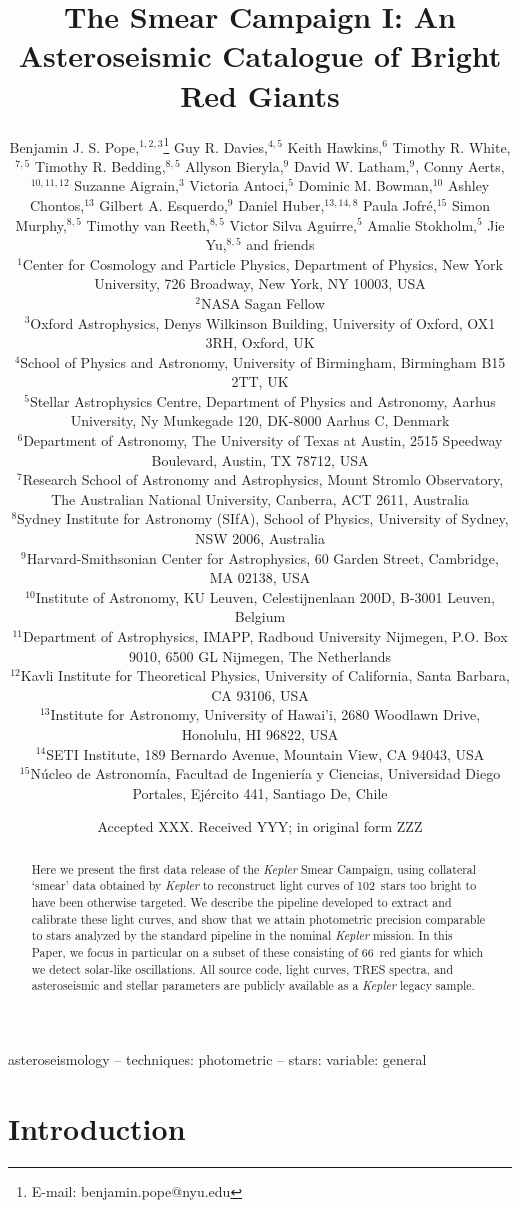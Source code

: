 \documentclass[a4paper,fleqn,usenatbib]{mnras}
\title[The Kepler Smear Campaign]{The \kepler Smear Campaign I: An Asteroseismic Catalogue of Bright Red Giants}
\author[B. J. S. Pope et al.]{Benjamin J. S. Pope,$^{1,2,3}$\thanks{E-mail: benjamin.pope@nyu.edu}
Guy R. Davies,$^{4,5}$
Keith Hawkins,$^{6}$
Timothy R. White,$^{7,5}$\newauthor
Timothy R. Bedding,$^{8,5}$
Allyson Bieryla,$^{9}$
David W. Latham,$^{9}$,
Conny Aerts,$^{10,11,12}$\newauthor
Suzanne Aigrain,$^{3}$ 
Victoria Antoci,$^{5}$
Dominic M. Bowman,$^{10}$
Ashley Chontos,$^{13}$\newauthor
Gilbert A. Esquerdo,$^{9}$
Daniel Huber,$^{13,14,8}$
Paula Jofr\'{e},$^{15}$
Simon Murphy,$^{8,5}$\newauthor
Timothy van Reeth,$^{8,5}$
Victor Silva Aguirre,$^{5}$
Amalie Stokholm,$^{5}$
Jie Yu,$^{8,5}$ \newauthor
and friends
\\
$^{1}$Center for Cosmology and Particle Physics, Department of Physics, New York University, 726 Broadway, New York, NY 10003, USA\\
$^{2}$NASA Sagan Fellow\\
$^{3}$Oxford Astrophysics, Denys Wilkinson Building, University of Oxford, OX1 3RH, Oxford, UK\\
$^{4}$School of Physics and Astronomy, University of Birmingham, Birmingham B15 2TT, UK\\
$^{5}$Stellar Astrophysics Centre, Department of Physics and Astronomy, Aarhus University, Ny Munkegade 120, DK-8000 Aarhus C, Denmark\\
$^{6}$Department of Astronomy, The University of Texas at Austin, 2515 Speedway Boulevard, Austin, TX 78712, USA\\
$^{7}$Research School of Astronomy and Astrophysics, Mount Stromlo Observatory, The Australian National University, Canberra, ACT 2611, Australia\\
$^{8}$Sydney Institute for Astronomy (SIfA), School of Physics, University of Sydney, NSW 2006, Australia\\
$^{9}$Harvard-Smithsonian Center for Astrophysics, 60 Garden Street, Cambridge, MA 02138, USA\\
$^{10}$Institute of Astronomy, KU Leuven, Celestijnenlaan 200D, B-3001 Leuven, Belgium\\
$^{11}$Department of Astrophysics, IMAPP, Radboud University Nijmegen, P.O. Box 9010, 6500 GL Nijmegen, The Netherlands\\
$^{12}$Kavli Institute for Theoretical Physics, University of California, Santa Barbara, CA 93106, USA\\
$^{13}$Institute for Astronomy, University of Hawai'i, 2680 Woodlawn Drive, Honolulu, HI 96822, USA\\
$^{14}$SETI Institute, 189 Bernardo Avenue, Mountain View, CA 94043, USA\\
$^{15}$N\'{u}cleo de Astronom\'{i}a, Facultad de Ingenier\'{i}a y Ciencias, Universidad Diego Portales, Ej\'{e}rcito 441, Santiago De, Chile\\
}
\date{Accepted XXX. Received YYY; in original form ZZZ}
\newcommand{\kepler}{\emph{Kepler}\xspace}
\begin{document}
\label{firstpage}
\pagerange{\pageref{firstpage}--\pageref{lastpage}}
\maketitle

\begin{abstract}
Here we present the first data release of the \kepler Smear Campaign, using collateral `smear' data obtained by \kepler to reconstruct light curves of 102~stars too bright to have been otherwise targeted. We describe the pipeline developed to extract and calibrate these light curves, and show that we attain photometric precision comparable to stars analyzed by the standard pipeline in the nominal \kepler mission. In this Paper, we focus in particular on a subset of these consisting of 66~red giants for which we detect solar-like oscillations. All source code, light curves, TRES spectra, and asteroseismic and stellar parameters are publicly available as a \kepler legacy sample.
\end{abstract}

\begin{keywords}
asteroseismology -- techniques: photometric -- stars: variable: general
\end{keywords}



\section{Introduction}
\label{intro}

\end{document}

